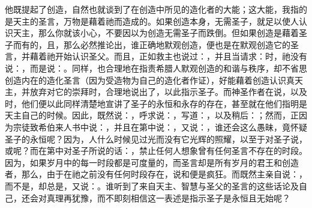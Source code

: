 他既提起了创造，自然也就谈到了在创造中所见的造化者的大能；这大能，我指的是天主的圣言，万物是藉着祂而造成的。如果创造本身，无需圣子，就足以使人认识天主，那么你就该小心，不要因以为创造无需圣子而跌倒。但如果创造是藉着圣子而有的，且，那么必然推论出，谁正确地默观创造，便也是在默观创造它的圣言，并藉着祂开始认识圣父。而且，正如救主也说过：，并且当请求：时，祂没有说：，而是说：。同样，也合理地在指责希腊人默观创造的和谐与秩序，却不省思创造内在的造化圣言（因为受造物为自己的造化者作证），好能藉着创造认识真天主，并放弃对它的崇拜时，合理地说出了，以此指示圣子。而神圣作者在说，以及时，他们便以此同样清楚地宣讲了圣子的永恒和永存的存在，甚至就在他们指明是天主自己的时候。因此，既然说：，呼求说：，写道：，以及稍后：；然而，正因为宗徒致希伯来人书中说：，并且在第中说：，又说：，谁还会这么愚昧，竟怀疑圣子的永恒呢？因为，人什么时候见过光而没有它光辉的照耀，以至于对圣子说，或呢？而在第中对圣子所说的话：，禁止任何人想象曾有任何圣言不存在的时段。因为，如果岁月中的每一时段都是可度量的，而圣言却是所有岁月的君王和创造者，那么，由于在祂之前没有任何时段存在，说和便是疯狂。而既然主亲自说：，而不是，却总是，又说：。谁听到了来自天主、智慧与圣父的圣言的这些话论及自己，还会对真理再犹豫，而不即刻相信这一表述是指示圣子是永恒且无始呢？\par

